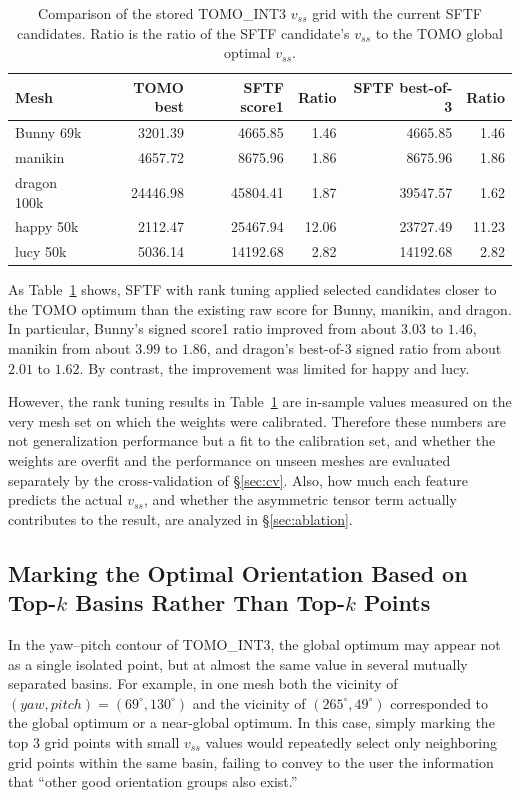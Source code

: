 \documentclass[11pt,a4paper]{article}
\begin{document}
\begin{table}[H]
\centering
\caption{Comparison of the stored TOMO\_INT3 $v_{ss}$ grid with the current SFTF candidates.
Ratio is the ratio of the SFTF candidate's $v_{ss}$ to the TOMO global optimal $v_{ss}$.}
\label{tab:sftf-tomo-comparison}
\begin{tabular}{lrrrrr}
\toprule
Mesh & TOMO best & SFTF score1 & Ratio & SFTF best-of-3 & Ratio\\
\midrule
Bunny 69k & 3201.39 & 4665.85 & 1.46 & 4665.85 & 1.46\\
manikin & 4657.72 & 8675.96 & 1.86 & 8675.96 & 1.86\\
dragon 100k & 24446.98 & 45804.41 & 1.87 & 39547.57 & 1.62\\
happy 50k & 2112.47 & 25467.94 & 12.06 & 23727.49 & 11.23\\
lucy 50k & 5036.14 & 14192.68 & 2.82 & 14192.68 & 2.82\\
\bottomrule
\end{tabular}
\end{table}

As Table~\ref{tab:sftf-tomo-comparison} shows,
SFTF with rank tuning applied selected candidates closer to the TOMO optimum than the existing raw score for Bunny, manikin, and dragon.
In particular, Bunny's signed score1 ratio improved from about $3.03$ to $1.46$,
manikin from about $3.99$ to $1.86$,
and dragon's best-of-3 signed ratio from about $2.01$ to $1.62$.
By contrast, the improvement was limited for happy and lucy.

However, the rank tuning results in Table~\ref{tab:sftf-tomo-comparison} are in-sample values measured on the very mesh set on which the weights were calibrated.
Therefore these numbers are not generalization performance but a fit to the calibration set,
and whether the weights are overfit and the performance on unseen meshes are evaluated separately by the cross-validation of \S\ref{sec:cv}.
Also, how much each feature predicts the actual $v_{ss}$, and whether the asymmetric tensor term actually contributes to the result, are analyzed in \S\ref{sec:ablation}.

\subsection{Marking the Optimal Orientation Based on Top-$k$ Basins Rather Than Top-$k$ Points}

In the yaw--pitch contour of TOMO\_INT3, the global optimum may appear not as a single isolated point, but
at almost the same value in several mutually separated basins.
For example, in one mesh both the vicinity of $(yaw,pitch)=(69^\circ,130^\circ)$ and
the vicinity of $(265^\circ,49^\circ)$ corresponded to the global optimum or a near-global optimum.
In this case, simply marking the top 3 grid points with small $v_{ss}$ values
would repeatedly select only neighboring grid points within the same basin,
failing to convey to the user the information that ``other good orientation groups also exist.''
\end{document}
